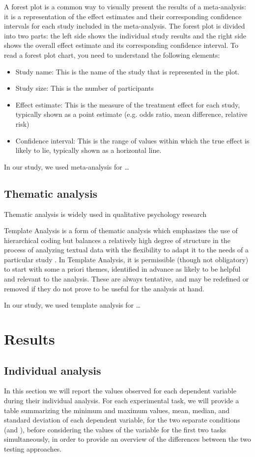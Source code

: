 A forest plot is a common way to visually present the results of a meta-analysis: it is a representation of the effect estimates and their corresponding confidence intervals for each study included in the meta-analysis. The forest plot is divided into two parts: the left side shows the individual study results and the right side shows the overall effect estimate and its corresponding confidence interval.
To read a forest plot chart, you need to understand the following elements:
\begin{itemize}
    \item Study name: This is the name of the study that is represented in the plot.
    \item Study size: This is the number of participants
    \item Effect estimate: This is the measure of the treatment effect for each study, typically shown as a point estimate (e.g. odds ratio, mean difference, relative risk)
    \item Confidence interval: This is the range of values within which the true effect is likely to lie, typically shown as a horizontal line.
\end{itemize}

In our study, we used meta-analysis for \dots
    

\subsection{Thematic analysis}
Thematic analysis is widely used in qualitative psychology research

Template Analysis is a form of thematic analysis which emphasizes the use of hierarchical coding but balances a relatively high degree of structure in the process of analyzing textual data with the flexibility to adapt it to the needs of a particular study \cite{ThematicAnalysis}. In Template Analysis, it is permissible (though not obligatory) to start with some a priori themes, identified in advance as likely to be helpful and relevant to the analysis. These are always tentative, and may be redefined or removed if they do not prove to be useful for the analysis at hand.

In our study, we used template analysis for \dots



\section{Results}
\subsection{Individual analysis}
In this section we will report the values observed for each dependent variable during their individual analysis. For each experimental task, we will provide a table summarizing the minimum and maximum values, mean, median, and standard deviation of each dependent variable, for the two separate conditions (\ie \tdd and \notdd), before considering the values of the variable for the first two tasks simultaneously, in order to provide an overview of the differences between the two testing approaches.

